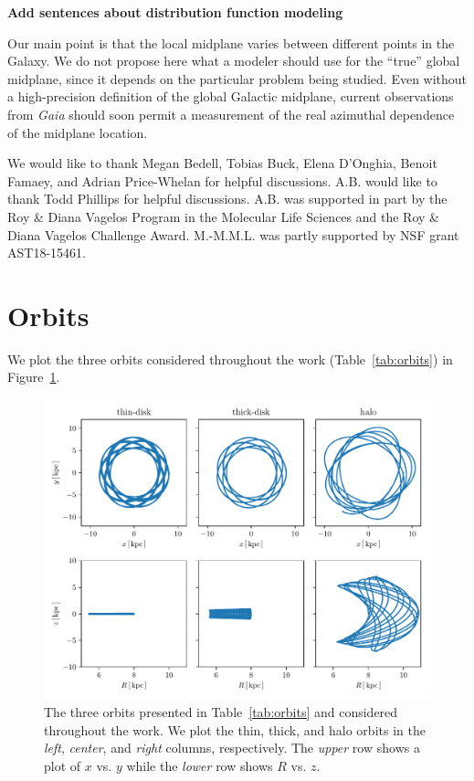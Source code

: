 \documentclass[twocolumn]{aastex62}
\newcommand{\Gus}[1]{\textcolor{red}{#1}}
\begin{document}
{\bf Add sentences about distribution function modeling}

Our main point is that the local midplane varies between different points in
the Galaxy. We do
not propose here what a modeler should use for the ``true'' global midplane,
since it depends on the particular problem being studied. Even without a
high-precision definition of the global Galactic midplane, current
observations from {\em Gaia} should soon permit a measurement of the real
azimuthal dependence of the midplane location.

\acknowledgments
We would like to thank Megan Bedell, Tobias Buck, Elena D'Onghia, Benoit
Famaey, and Adrian Price-Whelan for helpful discussions. A.B. would like to
thank Todd Phillips for helpful discussions. A.B. was supported in part by the
Roy \& Diana Vagelos Program in the Molecular Life Sciences and the Roy \&
Diana Vagelos Challenge Award.
M.-M.M.L. was partly supported by NSF grant AST18-15461.

\appendix
\section{Orbits} \label{app:orbits}
We plot the three orbits considered throughout the work
(Table~\ref{tab:orbits}) in Figure~\ref{fig:plot_orbits}.

\begin{figure}
\begin{center}
\includegraphics[width=\textwidth]{fig/orbits.pdf}
\end{center}
\caption{The three orbits presented in Table~\ref{tab:orbits} and considered
throughout the work. We plot the thin, thick, and halo orbits in the {\em
left}, {\em center}, and {\em right} columns, respectively. The {\em upper}
row shows a plot of $x$ vs. $y$ while the {\em lower} row shows $R$ vs. $z$.}
\label{fig:plot_orbits}
\end{figure}
\end{document}
